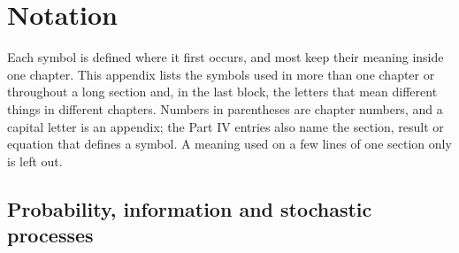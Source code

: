 \chapter{Notation}
\label{app:notation}

Each symbol is defined where it first occurs, and most keep their meaning inside one chapter. This appendix lists the symbols used in more than one chapter or throughout a long section and, in the last block, the letters that mean different things in different chapters. Numbers in parentheses are chapter numbers, and a capital letter is an appendix; the Part IV entries also name the section, result or equation that defines a symbol. A meaning used on a few lines of one section only is left out.

\section*{Probability, information and stochastic processes}

